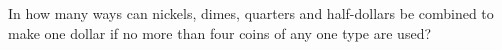 In how many ways can nickels, dimes, quarters and half-dollars be combined to make one dollar if no more than four coins of any one type are used?
